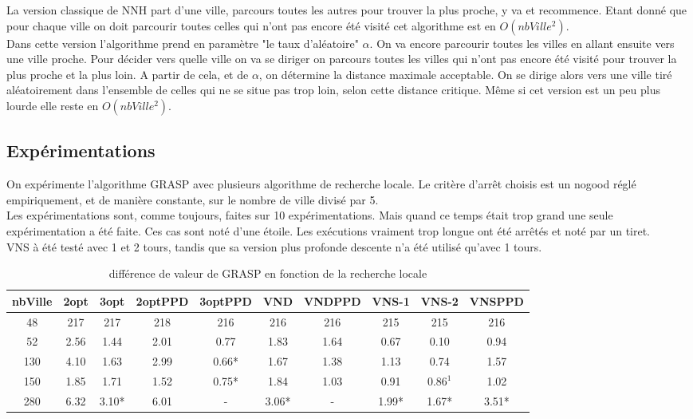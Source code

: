 \documentclass[12pt,a4paper]{article}
\begin{document}
La version classique de NNH part d'une ville, parcours toutes les autres pour trouver la plus proche, y va et recommence.  Etant donné que pour chaque ville on doit parcourir toutes celles qui n'ont pas encore été visité cet algorithme est en $O(nbVille ^2)$.\\

Dans cette version l'algorithme prend en paramètre "le taux d'aléatoire" $\alpha$. On va encore parcourir toutes les villes en allant ensuite vers une ville proche. Pour décider vers quelle ville on va se diriger on parcours toutes les villes qui n'ont pas encore été visité pour trouver la plus proche et la plus loin. A partir de cela, et de $\alpha$, on détermine la distance maximale acceptable. On se dirige alors vers une ville tiré aléatoirement dans l'ensemble de celles qui ne se situe pas trop loin, selon cette distance critique. Même si cet version est un peu plus lourde elle reste en $O(nbVille ^2)$.\\

\subsection{Expérimentations}

On expérimente l'algorithme GRASP avec plusieurs algorithme de recherche locale. Le critère d’arrêt choisis est un nogood réglé empiriquement, et de manière constante, sur le nombre de ville divisé par 5.\\
Les expérimentations sont, comme toujours, faites sur 10 expérimentations. Mais quand ce temps était trop grand une seule expérimentation a été faite. Ces cas sont noté d'une étoile. Les exécutions vraiment trop longue ont été arrêtés et noté par un tiret.\\
VNS à été testé avec 1 et 2 tours, tandis que sa version plus profonde descente n'a été utilisé qu'avec 1 tours.\\

\begin{table}[!h]
\centering
\begin{tabular}{|*{10}{c|}}
  \hline
  nbVille & 2opt & 3opt & 2optPPD & 3optPPD & VND & VNDPPD & VNS-1 & VNS-2 & VNSPPD \\
  \hline
  48 & 217 & 217 & 218 & 216 & 216 & 216 & 215 & 215 & 216 \\ 
  52 & 2.56 & 1.44 & 2.01 & 0.77 & 1.83 & 1.64 & 0.67 & 0.10 & 0.94 \\
  130 & 4.10 & 1.63 & 2.99 & 0.66* & 1.67 & 1.38 & 1.13 & 0.74 & 1.57 \\
  150 & 1.85 & 1.71 & 1.52 &  0.75* & 1.84 & 1.03 & 0.91 & $0.86^1$ & 1.02 \\  
  280 & 6.32 & 3.10* & 6.01 & - & 3.06* & - & 1.99* & 1.67* & 3.51* \\
  \hline
\end{tabular}
\caption{différence de valeur de GRASP en fonction de la recherche locale}
\label{recherchelocaleGRASPvaleurs}
\end{table}
\end{document}
